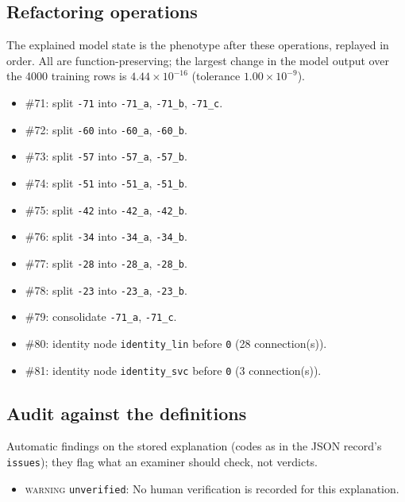 \begin{drafted}
\subsection{Refactoring operations}\label{app:churn100-s4-c3:operations}
The explained model state is the phenotype after these operations, replayed in order. All are function-preserving; the largest change in the model output over the 4000 training rows is $4.44\times 10^{-16}$ (tolerance $1.00\times 10^{-9}$).
\begin{itemize}
\item \#71: split \texttt{-71} into \texttt{-71\_\allowbreak{}a}, \texttt{-71\_\allowbreak{}b}, \texttt{-71\_\allowbreak{}c}.
\item \#72: split \texttt{-60} into \texttt{-60\_\allowbreak{}a}, \texttt{-60\_\allowbreak{}b}.
\item \#73: split \texttt{-57} into \texttt{-57\_\allowbreak{}a}, \texttt{-57\_\allowbreak{}b}.
\item \#74: split \texttt{-51} into \texttt{-51\_\allowbreak{}a}, \texttt{-51\_\allowbreak{}b}.
\item \#75: split \texttt{-42} into \texttt{-42\_\allowbreak{}a}, \texttt{-42\_\allowbreak{}b}.
\item \#76: split \texttt{-34} into \texttt{-34\_\allowbreak{}a}, \texttt{-34\_\allowbreak{}b}.
\item \#77: split \texttt{-28} into \texttt{-28\_\allowbreak{}a}, \texttt{-28\_\allowbreak{}b}.
\item \#78: split \texttt{-23} into \texttt{-23\_\allowbreak{}a}, \texttt{-23\_\allowbreak{}b}.
\item \#79: consolidate \texttt{-71\_\allowbreak{}a}, \texttt{-71\_\allowbreak{}c}.
\item \#80: identity node \texttt{identity\_\allowbreak{}lin} before \texttt{0} (28 connection(s)).
\item \#81: identity node \texttt{identity\_\allowbreak{}svc} before \texttt{0} (3 connection(s)).
\end{itemize}
\subsection{Audit against the definitions}\label{app:churn100-s4-c3:audit}
Automatic findings on the stored explanation (codes as in the JSON record's \texttt{issues}); they flag what an examiner should check, not verdicts.
\begin{itemize}
\item \textsc{warning} \texttt{unverified}: No human verification is recorded for this explanation.
\end{itemize}
\end{drafted}
